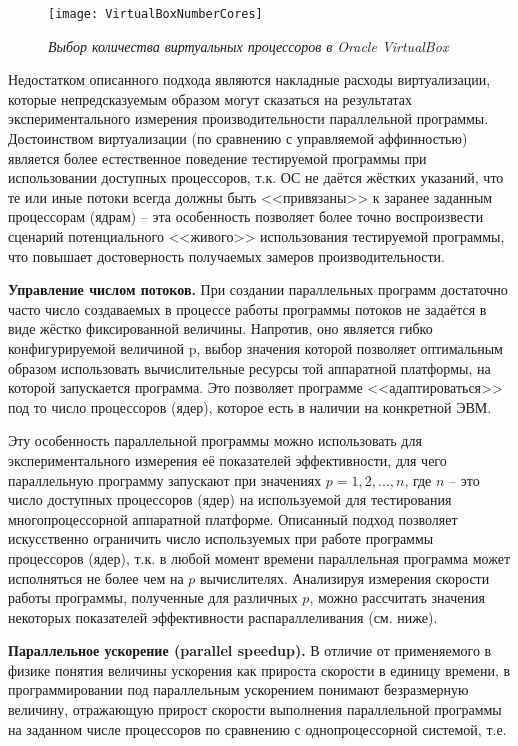 \begin{figure}[H]
    \texttt{[image: VirtualBoxNumberCores]}
    \caption{\textit{Выбор количества виртуальных процессоров в Oracle VirtualBox}}
    \label{VirtualBoxNumberCores:image}
\end{figure}

Недостатком описанного подхода являются накладные расходы виртуализации, которые непредсказуемым образом могут сказаться на результатах экспериментального измерения производительности параллельной программы. Достоинством виртуализации (по сравнению с управляемой аффинностью) является более естественное поведение тестируемой программы при использовании доступных процессоров, т.к. ОС не даётся жёстких указаний, что те или иные потоки всегда должны быть <<привязаны>> к заранее заданным процессорам (ядрам) – эта особенность позволяет более точно воспроизвести сценарий потенциального <<живого>> использования тестируемой программы, что повышает достоверность получаемых замеров производительности. 

\textbf{Управление числом потоков.} При создании параллельных программ достаточно часто число создаваемых в процессе работы программы потоков не задаётся в виде жёстко фиксированной величины. Напротив, оно является гибко конфигурируемой величиной p, выбор значения которой позволяет оптимальным образом использовать вычислительные ресурсы той аппаратной платформы, на которой запускается программа. Это позволяет программе <<адаптироваться>> под то число процессоров (ядер), которое есть в наличии на конкретной ЭВМ.

Эту особенность параллельной программы можно использовать для экспериментального измерения её показателей эффективности, для чего параллельную программу запускают при значениях $p = 1, 2, \ldots, n$, где $n$ – это число доступных процессоров (ядер) на используемой для тестирования многопроцессорной аппаратной платформе. Описанный подход позволяет искусственно ограничить число используемых при работе программы процессоров (ядер), т.к. в любой момент времени параллельная программа может исполняться не более чем на $p$ вычислителях. Анализируя измерения скорости работы программы, полученные для различных $p$, можно рассчитать значения некоторых показателей эффективности распараллеливания (см. ниже).

\textbf{Параллельное ускорение (parallel speedup).} В отличие от применяемого в физике понятия величины ускорения как прироста скорости в единицу времени, в программировании под параллельным ускорением понимают безразмерную величину, отражающую прирост скорости выполнения параллельной программы на заданном числе процессоров по сравнению с однопроцессорной системой, т.е.

